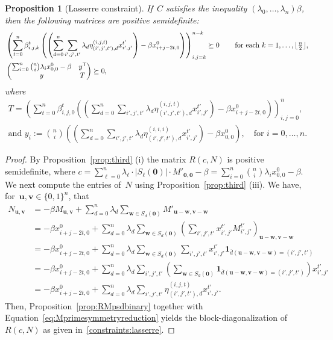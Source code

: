 \documentclass[10pt,a4paper]{article}
\newcommand{\one}{\mathbf{1}}
\newtheorem{proposition}[theorem]{Proposition}
\theoremstyle{definition}
\newcommand{\uu}{\mathbf{u}}
\newcommand{\vv}{\mathbf{v}}
\newcommand{\ww}{\mathbf{w}}
\newcommand{\zero}{\mathbf{0}}
\newcommand{\T}{^{\mathsf{T}}}
\begin{document}
\begin{proposition}[Lasserre constraint]\label{prop:thirdlasserrebinary}
If~$C$ satisfies the inequality $(\lambda_0,\ldots,\lambda_n)\beta$, then the 
   following matrices are positive semidefinite:
\begin{align}\label{constraints:lasserre}
&\left(\sum_{t=0}^n \beta_{i,j,k}^t \left(\left(\sum_{d=0}^n\sum_{i',j',t'}\lambda_d \eta_{(i',j',t'),d}^{(i,j,t)} x_{i',j' }^{t'}\right) - \beta x^0_{i+j-2t,0} \right)\right)_{i,j=k}^{n-k} \succeq 0 \, & \quad \text{for each $k=1,\ldots, \lfloor\tfrac{n}{2}\rfloor$}, \\
&\begin{pmatrix} \sum_{i=0}^n \binom{n}{i}\lambda_i x_{0,0}^0 -\beta & y\T \\ y & T \end{pmatrix} \succeq 0, \notag
\end{align}
where 
\begin{align*}
    T=\left(\sum_{t=0}^n \beta_{i,j,0}^t \left(\left(\sum_{d=0}^n\sum_{i',j',t'}\lambda_d \eta_{(i',j',t'),d}^{(i,j,t)} x_{i',j' }^{t'}\right) - \beta x^0_{i+j-2t,0} \right)\right)_{i,j=0}^{n}, \\\text{and } y_i:=\binom{n}{i}\left(\left(\sum_{d=0}^n\sum_{i',j',t'}\lambda_d \eta_{(i',j',t'),d}^{(i,i,i)} x_{i',j' }^{t'}\right) - \beta x^0_{0,0} \right), \quad \text{for $i=0,\ldots,n$}.
\end{align*}
\end{proposition}
\begin{proof} 
By Proposition~\ref{prop:third} (i) the matrix $R(c,N)$ is positive semidefinite, where $c=\sum_{\ell=0}^n \lambda_{\ell}\cdot|S_{\ell}(\zero)|\cdot M'_{\zero,\zero} -\beta = \sum_{i=0}^n \binom{n}{i}\lambda_i x_{0,0}^0 -\beta$. We next compute the entries of~$N$ using Proposition~\ref{prop:third} (iii). We have, for~$\uu,\vv \in \{0,1\}^n$, that
\begin{align*}
N_{\uu,\vv}&= -\beta M_{\uu,\vv} + \sum_{d =0}^n \lambda_{d} \sum_{\ww \in S_d(\zero)} M'_{\uu-\ww, \vv-\ww}
\\&= -\beta x_{i+j-2t,0}^0 +  \sum_{d=0}^n \lambda_d\sum_{\ww \in S_d(\bm 0  )} \left(\sum_{i',j',t'} x_{i',j'}^{t'} M_{i',j'}^{t'}  \right)_{\uu-\ww,\vv-\ww} 
 \\&= -\beta x_{i+j-2t,0}^0+ \sum_{d=0}^n \lambda_{d} \sum_{\ww \in S_d(\bm 0 )} \sum_{i',j',t'} x_{i',j'}^{t'}\one_{\overline{d}(\uu-\ww,\vv-\ww)=(i',j',t')} 
 \\&= -\beta x_{i+j-2t,0}^0+ \sum_{d=0}^n \lambda_{d} \sum_{i',j',t'} \left( \sum_{\ww \in S_d(\bm 0 )}  \one_{\overline{d}(\uu-\ww,\vv-\ww)=(i',j',t')} \right) x_{i',j'}^{t'}
 \\&= -\beta x_{i+j-2t,0}^0 + \sum_{d=0}^n\lambda_d \sum_{i',j',t'}\eta_{(i',j',t'),d}^{(i,j,t)} x_{i',j' }^{t'}. 
\end{align*}
Then, Proposition~\ref{prop:RMpsdbinary} together with Equation~\eqref{eq:Mprimesymmetryreduction} yields the block-diagonalization of~$R(c,N)$ as given in~\eqref{constraints:lasserre}.
\end{proof} 
\end{document}
